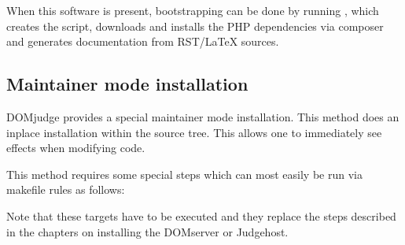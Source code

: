 \documentclass[a4paper,10pt,english,openany]{sphinxmanual}
\begin{document}
\begin{sphinxVerbatim}[commandchars=\\\{\}]
      \PYGZbs{}
       \PYGZbs{}
     
\end{sphinxVerbatim}

\sphinxAtStartPar
When this software is present, bootstrapping can be done by running
, which creates the  script,
downloads and installs the PHP dependencies via composer and
generates documentation from RST/LaTeX sources.


\subsection{Maintainer mode installation}
\label{\detokenize{develop:maintainer-mode-installation}}
\sphinxAtStartPar
DOMjudge provides a special maintainer mode installation.
This method does an in\sphinxhyphen{}place installation within the source
tree. This allows one to immediately see effects when modifying
code.

\sphinxAtStartPar
This method requires some special steps which can most easily
be run via makefile rules as follows:

\begin{sphinxVerbatim}[commandchars=\\\{\}]
  \PYG{p}{[}   \PYG{p}{]}
 
\end{sphinxVerbatim}

\sphinxAtStartPar
Note that these targets have to be executed  and
they replace the steps described in the chapters on installing
the DOMserver or Judgehost.
\end{document}
